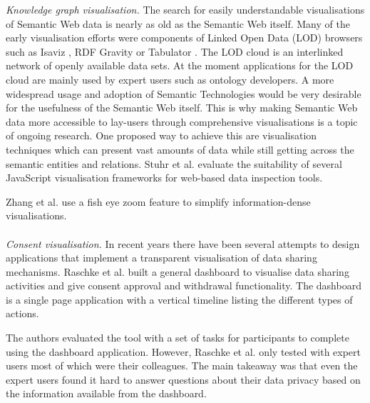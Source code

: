 \documentclass[../paper.tex]{subfiles}
\begin{document}
 \textit{Knowledge graph visualisation.} 
 The search for easily understandable visualisations of Semantic Web data is nearly as old as the Semantic Web itself.
 Many of the early visualisation efforts were components of Linked Open Data (LOD) browsers such as Isaviz \cite{isaviz}, RDF Gravity \cite{goyal2004rdfgravity} or Tabulator \cite{tabulator-berners-lee-2006}.  The LOD cloud is an interlinked network of openly available data sets.
 At the moment applications for the LOD cloud are mainly used by expert users such as ontology developers.
 A more widespread usage and adoption of Semantic Technologies would be very desirable for the usefulness of the Semantic Web itself.
 This is why making Semantic Web data more accessible to lay-users through comprehensive visualisations is a topic of ongoing research.
 One proposed way to achieve this are visualisation techniques which can present vast amounts of data while still getting across the semantic entities and relations.
 Stuhr et al. \cite{lodwheel} evaluate the suitability of several JavaScript visualisation frameworks for web-based data inspection tools.     
 
 Zhang et al. \cite{rdfFisheye} use a fish eye zoom feature to simplify information-dense visualisations.
 \\\\
 \textit{Consent visualisation.}
  In recent years there have been several attempts to design applications that
  implement a transparent visualisation of data sharing mechanisms. Raschke et al.
  \cite{core_privacy_dashboard_2018} built a general dashboard to visualise
  data sharing activities and give consent approval and withdrawal functionality.
  The dashboard is a single page application with a vertical timeline listing
  the different types of actions.

  The authors evaluated the tool with a set of tasks for participants to
  complete using the dashboard application. However, Raschke et al.
  \cite{core_privacy_dashboard_2018} only tested with expert users most of which 
  were their colleagues. The main takeaway was that even the expert users
  found it hard to answer questions about their data privacy based on the
  information available from the dashboard.
\end{document}
